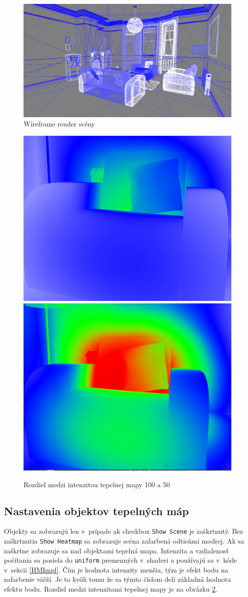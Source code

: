 \begin{figure}[t!]\label{WireframeScene}
    \centering
    \includegraphics[width=0.90\linewidth]{obrazky-figures/wireframeScene.png}
    \caption{Wireframe render scény}
\end{figure}

\begin{figure}[b!]\label{Intenzita}
    \centering
    \includegraphics[width=0.45\linewidth]{obrazky-figures/int100.png}
    \includegraphics[width=0.45\linewidth]{obrazky-figures/int50.png}
    \caption{Rozdiel medzi intenzitou tepelnej mapy 100 a 50}
\end{figure}

\subsection*{Nastavenia objektov tepelných máp} 
Objekty sa zobrazujú len v~prípade ak checkbox \verb|Show Scene| je zaškrtnutý. Bez zaškrtnutia \verb|Show Heatmap| sa zobrazuje scéna zafarbená odtieňmi modrej. Ak sa zaškrtne zobrazuje sa nad objektami tepelná mapa. Intenzita a vzdialenosť počítania sa posiela do \verb|uniform| premenných v~shaderi a používajú sa v~kóde v~sekcii \ref{HMImpl}. Čím je hodnota intenzity menšia, tým je efekt bodu na zafarbenie väčší. Je to kvôli tomu že sa týmto číslom delí základná hodnota efektu bodu. Rozdiel medzi intenzitami tepelnej mapy je na obrázku \ref{Intenzita}.


